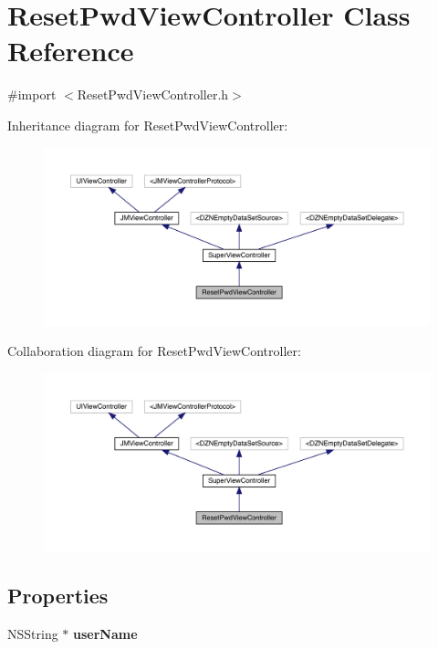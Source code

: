 \hypertarget{interface_reset_pwd_view_controller}{}\section{Reset\+Pwd\+View\+Controller Class Reference}
\label{interface_reset_pwd_view_controller}


{\ttfamily \#import $<$Reset\+Pwd\+View\+Controller.\+h$>$}



Inheritance diagram for Reset\+Pwd\+View\+Controller\+:\nopagebreak
\begin{figure}[H]
\begin{center}
\leavevmode
\includegraphics[width=350pt]{interface_reset_pwd_view_controller__inherit__graph}
\end{center}
\end{figure}


Collaboration diagram for Reset\+Pwd\+View\+Controller\+:\nopagebreak
\begin{figure}[H]
\begin{center}
\leavevmode
\includegraphics[width=350pt]{interface_reset_pwd_view_controller__coll__graph}
\end{center}
\end{figure}
\subsection*{Properties}
\begin{DoxyCompactItemize}
\item 
\mbox{\label{interface_reset_pwd_view_controller_a6dfa5b1d5a1d90762e078af4fa562db6}} 
N\+S\+String $\ast$ {\bfseries user\+Name}
\end{DoxyCompactItemize}
